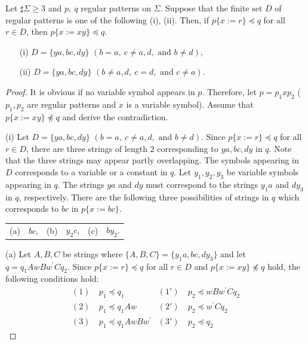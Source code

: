 
\begin{lem}\label{片方}
Let $\sharp \Sigma \ge 3$ and $p,~q$ regular patterns on $\Sigma$.
Suppose that the finite set $D$ of regular patterns is one of the following {\rm (i), (ii)}.
Then, if $p \{ x := r \} \preceq q$ for all $r \in D$, then $p \{ x := xy \} \preceq q$.
\begin{enumerate}
\item[{\rm (i)}] $D=\{ ya, bc, dy \}$ $(b = a,~c \not = a,d,\mbox{~and~} b \not = d)$,
\item[{\rm (ii)}] $D=\{ ya, bc, dy \}$ $(b \not = a,d,~c = d,\mbox{~and~} c \not = a)$.
\end{enumerate}
\end{lem}
\begin{proof}

It is obvious if no variable symbol appears in $p$.
Therefore, let $p=p_{1}xp_{2}$ ($p_{1}, p_{2}$ are regular patterns and $x$ is a variable symbol). Assume that $p \{ x := xy \} \not \preceq q$ and derive the contradiction.

\noindent\textrm{(i)}
Let $D=\{ ya, bc, dy \}$ $(b = a,~c \not = a,d,\mbox{~and~}b \not = d)$.
Since $p \{ x := r \} \preceq q$ for all $r \in D$, there are three strings of length $2$ corresponding to $ya, bc, dy$ in $q$. Note that the three strings may appear partly overlapping.
The symbols appearing in $D$ corresponds to a variable or a constant in $q$.
Let $y_{1}, y_{2}, y_{3}$ be variable symbols appearing in $q$.
The strings $ya$ and $dy$ must correspond to the strings $y_{1}a$ and $dy_{3}$ in $q$, respectively.
There are the following three possibilities of strings in $q$ which corresponds to $bc$ in $p\{x:=bc\}$.
\begin{center}
\begin{tabular}{cccccc}
\textrm{(a)} & $bc$, &
\textrm{(b)} & $y_{2}c$, &
\textrm{(c)} & $by_{2}$.
\end{tabular}
\end{center}

\textrm{(a)}
Let $A,B,C$ be strings where $\{ A,B,C \} = \{ y_{1}a,bc,dy_{3} \}$ and let $q=q_{1}AwBw^{\prime}Cq_{2}$.
Since $p \{ x := r \} \preceq q$ for all $r \in D$ and $p \{ x := xy \} \not \preceq q$ hold, the following conditions hold:
\begin{align*}
(1)~& p_{1} \preceq q_{1} & (1')~& p_{2} \preceq wBw^{\prime}Cq_{2} \\
(2)~& p_{1} \preceq q_{1}Aw & (2')~& p_{2} \preceq w^{\prime}Cq_{2} \\
(3)~& p_{1} \preceq q_{1}AwBw^{\prime} & (3')~& p_{2} \preceq q_{2}
\end{align*}


\end{proof}
